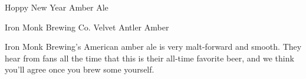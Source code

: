 \begin{recipie}{Hoppy New Year Amber Ale}
\begin{ingredientsblock}
\begin{yeasts}
\end{yeasts}

\end{ingredientsblock}

\end{recipie}

\begin{recipie}{Iron Monk Brewing Co. Velvet Antler Amber}

\begin{aboutblock}
Iron Monk Brewing's American amber ale is very malt-forward and smooth. They hear from
fans all the time that this is their all-time favorite beer, and we think you’ll agree
once you brew some yourself.
\end{aboutblock}


\begin{methodandtiming}
 
\begin{mashsteps}
\end{mashsteps}

\begin{fermentationsteps}
\end{fermentationsteps}

\end{methodandtiming}

\pagebreak

\begin{ingredientsblock}

\begin{malts}
\end{malts}

\begin{hops}
\end{hops}

\begin{yeasts}
\end{yeasts}


\end{ingredientsblock}
\end{recipie}
